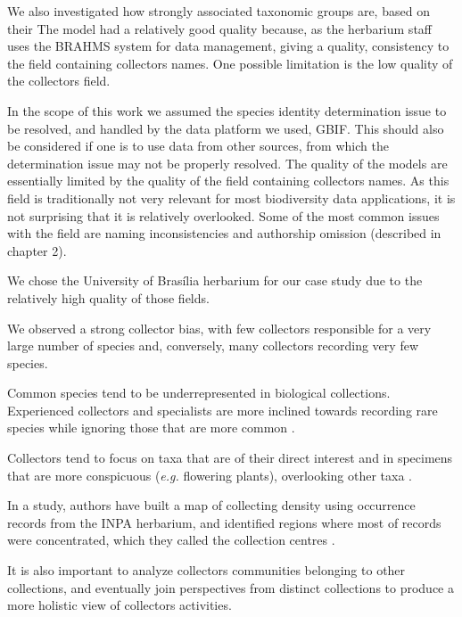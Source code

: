 We also investigated how strongly associated taxonomic groups are, based on their
The model had a relatively good quality because, as the herbarium staff uses the BRAHMS system for data management, giving a quality, consistency to the field containing collectors names.
One possible limitation is the low quality of the collectors field.




In the scope of this work we assumed the species identity determination issue to be resolved, and handled by the data platform we used, GBIF. 
This should also be considered if one is to use data from other sources, from which the determination issue may not be properly resolved.
The quality of the models are essentially limited by the quality of the field containing collectors names.
As this field is traditionally not very relevant for most biodiversity data applications, it is not surprising that it is relatively overlooked.
Some of the most common issues with the field are naming inconsistencies and authorship omission (described in chapter 2).




We chose the University of Brasília herbarium for our case study due to the relatively high quality of those fields.

We observed a strong collector bias, with few collectors responsible for a very large number of species and, conversely, many collectors recording very few species.

Common species tend to be underrepresented in biological collections.
Experienced collectors and specialists are more inclined towards recording rare species while ignoring those that are more common \cite{Nelson1990}.

Collectors tend to focus on taxa that are of their direct interest and in specimens that are more conspicuous (\textit{e.g.} flowering plants), overlooking other taxa \cite{VanGemerden2005}.




In a study, authors have built a map of collecting density using occurrence records from the INPA herbarium, and identified regions where most of records were concentrated, which they called the collection centres \cite{Nelson1990}.


It is also important to analyze collectors communities belonging to other collections, and eventually join perspectives from distinct collections to produce a more holistic view of collectors activities.


